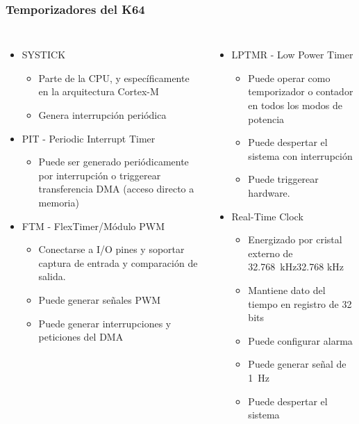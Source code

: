 \documentclass[10.5pt,scale=1.0,t,aspectratio=169,hyperref={pdfpagelabels=false}]{beamer}
\begin{document}
\begin{frame}
	\frametitle{Temporizadores del K64}
	{\small
	\begin{columns}
		\begin{itemize}
			\item SYSTICK
			\begin{itemize}
				\item Parte de la CPU, y específicamente en la arquitectura Cortex-M
				\item Genera interrupción periódica
			\end{itemize}
			\item PIT - Periodic Interrupt Timer
			\begin{itemize}
				\item Puede ser generado periódicamente por interrupción o triggerear transferencia DMA (acceso directo a memoria)
			\end{itemize}
			\item FTM - FlexTimer/Módulo PWM 
			\begin{itemize}
				\item Conectarse a I/O pines y soportar captura de entrada y comparación de salida. 
				\item Puede generar se\~nales PWM
				\item Puede generar interrupciones y peticiones del DMA
			\end{itemize}
		\end{itemize}
	
		\begin{itemize}
			\item LPTMR - Low Power Timer
			\begin{itemize}
				\item Puede operar como temporizador o contador en todos los modos de potencia
				\item Puede despertar el sistema con interrupción
				\item Puede triggerear hardware. 
			\end{itemize}
			\item Real-Time Clock
			\begin{itemize}
				\item Energizado por cristal externo de \SI{32.768}{\kilo\hertz}32.768 kHz
				\item Mantiene dato del tiempo en registro de 32 bits
				\item Puede configurar alarma
				\item Puede generar se\~nal de \SI{1}{\hertz}
				\item Puede despertar el sistema
			\end{itemize}
		\end{itemize}
	\end{columns}
	}
\end{frame}
\end{document}
